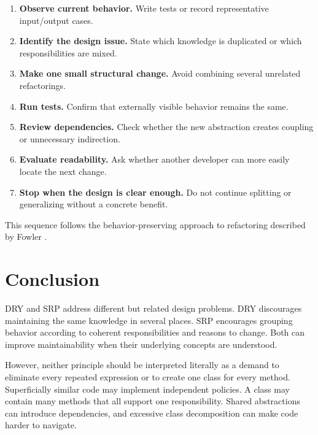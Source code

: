 \documentclass[12pt,a4paper]{article}
\begin{document}
\begin{enumerate}

\item \textbf{Observe current behavior.} Write tests or record representative input/output cases.

\item \textbf{Identify the design issue.} State which knowledge is duplicated or which responsibilities are mixed.

\item \textbf{Make one small structural change.} Avoid combining several unrelated refactorings.

\item \textbf{Run tests.} Confirm that externally visible behavior remains the same.

\item \textbf{Review dependencies.} Check whether the new abstraction creates coupling or unnecessary indirection.

\item \textbf{Evaluate readability.} Ask whether another developer can more easily locate the next change.

\item \textbf{Stop when the design is clear enough.} Do not continue splitting or generalizing without a concrete benefit.

\end{enumerate}

This sequence follows the behavior-preserving approach to refactoring described by Fowler \cite{fowler2004refactoring,fowler2018refactoring}.

\section{Conclusion}

DRY and SRP address different but related design problems. DRY discourages maintaining the same knowledge in several places. SRP encourages grouping behavior according to coherent responsibilities and reasons to change. Both can improve maintainability when their underlying concepts are understood.

However, neither principle should be interpreted literally as a demand to eliminate every repeated expression or to create one class for every method. Superficially similar code may implement independent policies. A class may contain many methods that all support one responsibility. Shared abstractions can introduce dependencies, and excessive class decomposition can make code harder to navigate.
\end{document}
